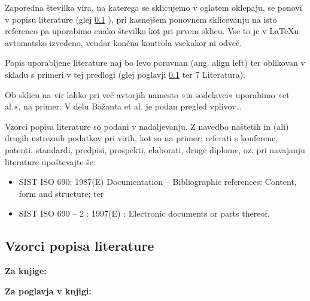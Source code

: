 Zaporedna številka vira, na katerega se sklicujemo v oglatem oklepaju, se ponovi v popisu literature (glej \ref{sec:vzorci_lit} ), pri kasnejšem ponovnem sklicevanju na isto referenco pa uporabimo enako številko kot pri prvem sklicu. Vse to je v \LaTeX u avtomatsko izvedeno, vendar končna kontrola vsekakor ni odveč.

Popis uporabljene literature naj bo levo poravnan (ang. align left) ter 
oblikovan v skladu s primeri v tej predlogi (glej poglavji \ref{sec:vzorci_lit} 
 ter 7 Literatura).

Ob sklicu na vir lahko pri več avtorjih namesto »in sodelavci« uporabimo »et al.«, na primer: V delu Bažanta et al. \cite{bazant_1991} je podan pregled vplivov\ldots

Vzorci popisa literature so podani v nadaljevanju. Z navedbo naštetih in (ali) drugih ustreznih podatkov pri virih, kot so na primer: referati s konferenc, patenti, standardi, predpisi, prospekti, elaborati, druge diplome, oz. pri navajanju literature upoštevajte še:
\begin{itemize}
\item SIST ISO 690: 1987(E) Documentation – Bibliographic references: Content, form and structure; ter
\item SIST ISO 690 – 2 : 1997(E) : Electronic documents or parts thereof.
\end{itemize}


\subsection{Vzorci popisa literature}\label{sec:vzorci_lit}

\textbf{Za knjige:}

\textbf{Za poglavja v knjigi:}

